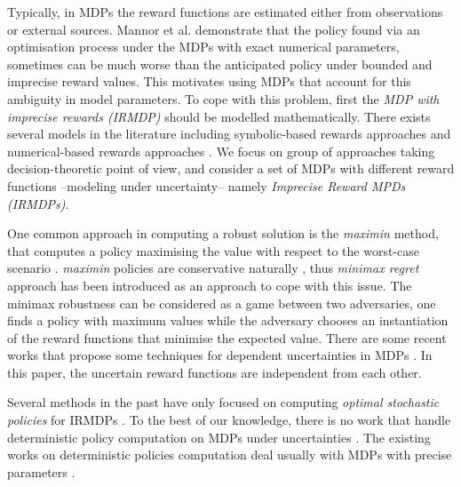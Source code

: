 
Typically, in MDPs the reward functions are estimated either from observations or external sources. Mannor et al.  demonstrate that the policy found via an optimisation process under the MDPs with exact numerical parameters, sometimes can be much worse than the anticipated policy under bounded and imprecise reward values. This motivates using MDPs that account for this ambiguity in model parameters. To cope with this problem, first the \textit{MDP with imprecise rewards (IRMDP)} should be modelled mathematically. There exists several models in the literature including symbolic-based rewards approaches \cite{Furnkranz2012,Weng2012} and numerical-based rewards approaches \cite{bell1982,Regan2009,Xu2009}. We focus on group of approaches taking decision-theoretic point of view, and consider a set of MDPs with different reward functions --modeling under uncertainty-- namely \textit{Imprecise Reward MPDs (IRMDPs)}. 

One common approach in computing a robust solution is the \textit{maximin} method, that computes a policy maximising the value with respect to the worst-case scenario \cite{GIVAN2000,Iyengar2005,mastin2012,Nilim2005}. \textit{maximin} policies are conservative naturally \cite{Delage2007}, thus \textit{minimax regret} approach \cite{Regan2009,Xu2009} has been introduced as an approach to cope with this issue. The minimax robustness can be considered as a game between two adversaries, one finds a policy with maximum values while the adversary chooses an instantiation of the reward functions that minimise the expected value. There are some recent works that propose some techniques for dependent uncertainties in MDPs \cite{Mannor2012,Wiesemann2013}. In this paper, the uncertain reward functions are independent from each other. 

Several methods in the past have only focused on computing  \textit{optimal stochastic policies} for IRMDPs  \cite{Regan2009,Regan2010,Xu2009}. %
To the best of our knowledge, there is no work that handle deterministic policy computation on MDPs under uncertainties . The existing works on deterministic policies computation deal usually with MDPs with precise parameters \cite{Dolgov2005,Montufar2015}. %